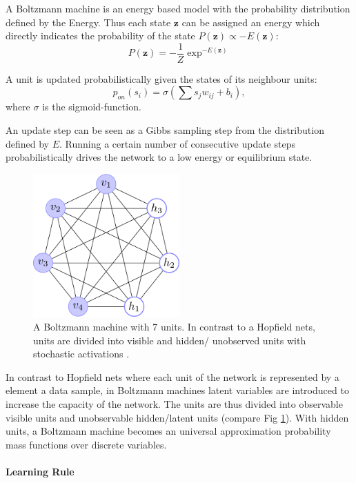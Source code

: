 A Boltzmann machine is an energy based model with the probability distribution defined by the Energy.
Thus each state $\textbf{z}$ can be assigned an energy which directly indicates the probability of the state $P(\textbf{z}) \propto -E(\textbf{z})$:
\[
P(\textbf{z}) = - \frac{1}{Z} \exp^{-E(\textbf{z})} 
\]

A unit is updated probabilistically given the states of its neighbour units:
\[
p_{on}(s_i) = \sigma( \sum s_j w_{ij} + b_i ), 
\]
where $\sigma$ is the sigmoid-function.

An update step can be seen as a Gibbs sampling step from the distribution defined by $E$.
Running a certain number of consecutive update steps probabilistically drives the network to a low energy or equilibrium state.


\begin{figure}
	\centering
    	\includegraphics[width=0.5\textwidth]{imgs/bm.png} 
    \caption[A Boltzmann machine with 7 units.]{A Boltzmann machine with 7 units. In contrast to a Hopfield nets, units are divided into visible and hidden/ unobserved units with stochastic activations \cite{boltzImg}.}
	\label{fig:bm}
\end{figure}

In contrast to Hopfield nets where each unit of the network is represented by a element a data sample, in Boltzmann machines latent variables are introduced to increase the capacity of the network.
The units are thus divided into observable visible units and unobservable hidden/latent units (compare Fig \ref{fig:bm}).
With hidden units, a Boltzmann machine becomes an universal approximation probability mass functions over discrete variables.


\paragraph{Learning Rule} \label{c:cd}


